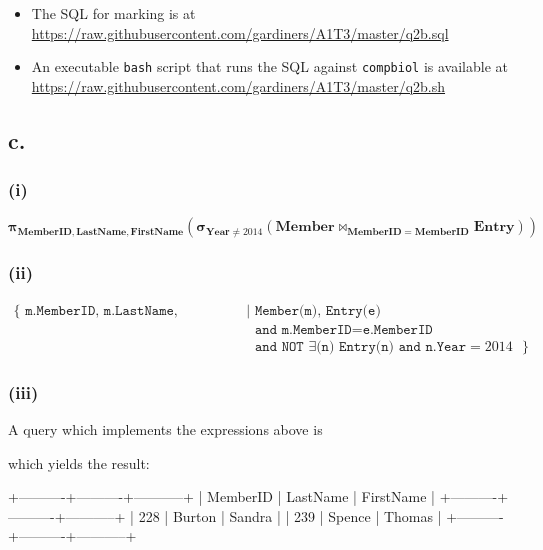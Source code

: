 \documentclass{article}
\newcommand{\select}[1]{
\boldsymbol{\sigma}_{#1}
}
\newcommand{\project}[1]{
\boldsymbol{\pi}_{#1}
}
\newcommand{\join}[1]{
\boldsymbol{\bowtie}_{#1}
}
\begin{document}
\begin{itemize}
    \item The SQL for marking is at \url{https://raw.githubusercontent.com/gardiners/A1T3/master/q2b.sql}
    \item An executable \texttt{bash} script that runs the SQL against \texttt{compbiol} is available at \url{https://raw.githubusercontent.com/gardiners/A1T3/master/q2b.sh}
\end{itemize}

\subsection{c.}

\subsubsection{(i)}

$$
\project{\mathbf{MemberID, LastName, FirstName}}
\left(
    \select{\mathbf{Year} \ne 2014}
        \left(\mathbf{Member} \join{\mathbf{MemberID} = \mathbf{MemberID}} \mathbf{Entry} \right)
\right)
$$

\subsubsection{(ii)}

$$
\begin{aligned}
\{
\texttt{ m.MemberID, m.LastName, m.FirstName } | &\texttt{ Member(m), Entry(e)} \\
    &\texttt{ and m.MemberID} = \texttt{e.MemberID} \\
    &\texttt{ and NOT } \exists \texttt{(n) Entry(n) and n.Year} = 2014
\texttt{ } \}
\end{aligned}
$$

\subsubsection{(iii)}

A query which implements the expressions above is


which yields the result:

\begin{bashinline}
+----------+----------+-----------+
| MemberID | LastName | FirstName |
+----------+----------+-----------+
|      228 | Burton   | Sandra    |
|      239 | Spence   | Thomas    |
+----------+----------+-----------+
\end{bashinline}
\end{document}
